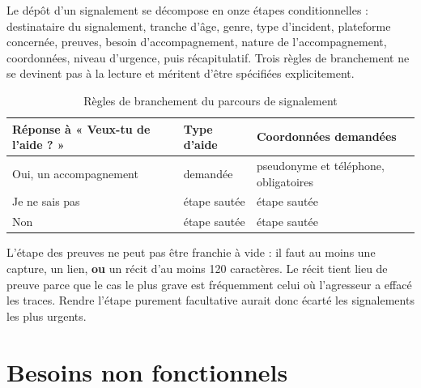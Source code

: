 \documentclass[11pt,a4paper,oneside,openany]{report}
\begin{document}
Le dépôt d'un signalement se décompose en onze étapes conditionnelles :
destinataire du signalement, tranche d'âge, genre, type d'incident, plateforme
concernée, preuves, besoin d'accompagnement, nature de l'accompagnement,
coordonnées, niveau d'urgence, puis récapitulatif. Trois règles de branchement
ne se devinent pas à la lecture et méritent d'être spécifiées explicitement.

\begin{table}[htbp]
\centering
\small
\caption{Règles de branchement du parcours de signalement}
\label{tab:branchement}
\begin{tabularx}{\textwidth}{@{}L{3.5cm} L{2.6cm} X@{}}
\toprule
\textbf{Réponse à « Veux-tu de l'aide ? »} & \textbf{Type d'aide} &
\textbf{Coordonnées demandées} \\
\midrule
Oui, un accompagnement & demandée & pseudonyme et téléphone, obligatoires \\
Je ne sais pas & étape sautée & étape sautée \\
Non & étape sautée & étape sautée \\
\bottomrule
\end{tabularx}
\end{table}

\begin{vigilance}
\small
L'étape des preuves ne peut pas être franchie à vide : il faut au moins une
capture, un lien, \textbf{ou} un récit d'au moins 120 caractères. Le récit tient
lieu de preuve parce que le cas le plus grave est fréquemment celui où
l'agresseur a effacé les traces. Rendre l'étape purement facultative aurait
donc écarté les signalements les plus urgents.
\end{vigilance}

\section{Besoins non fonctionnels}
\end{document}
